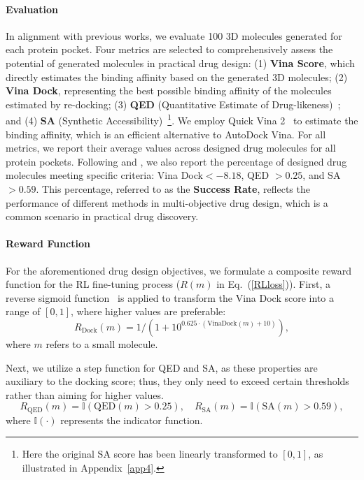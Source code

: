 \paragraph{Evaluation} In alignment with previous works, we evaluate 100 3D molecules generated for each protein pocket. Four metrics are selected to comprehensively assess the potential of generated molecules in practical drug design: (1) \textbf{Vina Score}, which directly estimates the binding affinity based on the generated 3D molecules; (2) \textbf{Vina Dock}, representing the best possible binding affinity of the molecules estimated by re-docking; (3) \textbf{QED} (Quantitative Estimate of Drug-likeness)~\citep{QED}; and (4) \textbf{SA} (Synthetic Accessibility)~\citep{SA}\footnote{Here the original SA score has been linearly transformed to $[0,1]$, as illustrated in Appendix~\ref{app4}.}. We employ Quick Vina 2~\citep{QuickVina2} to estimate the binding affinity, which is an efficient alternative to AutoDock Vina. For all metrics, we report their average values across designed drug molecules for all protein pockets. Following \cite{DESERT} and \cite{DecompDiff}, we also report the percentage of designed drug molecules meeting specific criteria: Vina Dock$<-8.18$, QED $>0.25$, and SA$>0.59$. This percentage, referred to as the \textbf{Success Rate}, reflects the performance of different methods in multi-objective drug design, which is a common scenario in practical drug discovery.

\paragraph{Reward Function} For the aforementioned drug design objectives, we formulate a composite reward function for the RL fine-tuning process ($R(m)$ in Eq.~(\ref{RLloss})). First, a reverse sigmoid function~\citep{MolRL-MGPT} is applied to transform the Vina Dock score into a range of $[0,1]$, where higher values are preferable:
\begin{equation}
R_{\mathrm{Dock}}(m)=1/(1+10^{0.625\cdot(\mathrm{VinaDock}(m)+10)}),
\end{equation}
where $m$ refers to a small molecule.

Next, we utilize a step function for QED and SA, as these properties are auxiliary to the docking score; thus, they only need to exceed certain thresholds rather than aiming for higher values.
\begin{equation}
R_{\mathrm{QED}}(m)=\mathbb{I}(\mathrm{QED}(m)>0.25), \quad R_{\mathrm{SA}}(m)=\mathbb{I}(\mathrm{SA}(m)>0.59),
\end{equation}
where $\mathbb{I}(\cdot)$ represents the indicator function.

